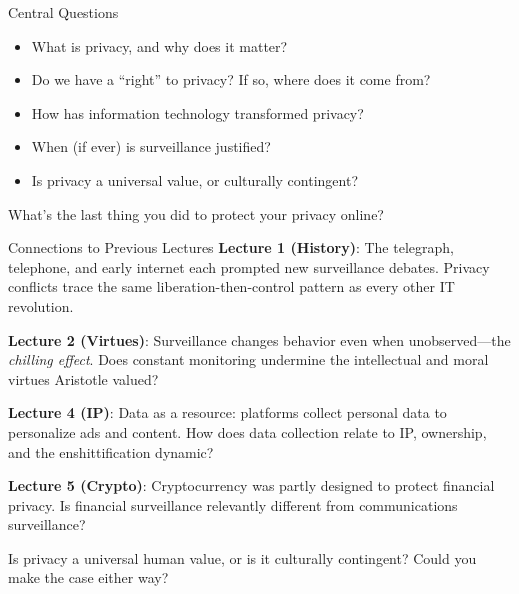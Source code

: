 ﻿\documentclass[aspectratio=169,11pt]{beamer}
\begin{document}
\begin{frame}{Central Questions}
\begin{itemize}
    \item What is privacy, and why does it matter?
    \item Do we have a ``right'' to privacy? If so, where does it come from?
    \item How has information technology transformed privacy?
    \item When (if ever) is surveillance justified?
    \item Is privacy a universal value, or culturally contingent?
\end{itemize}

\vspace{0.5em}
\begin{discussionbox}[Discussion]
What's the last thing you did to protect your privacy online?
\end{discussionbox}
\end{frame}

\begin{frame}{Connections to Previous Lectures}
\textbf{Lecture 1 (History)}: The telegraph, telephone, and early internet each prompted new surveillance debates. Privacy conflicts trace the same liberation-then-control pattern as every other IT revolution.

\vspace{0.2cm}
\textbf{Lecture 2 (Virtues)}: Surveillance changes behavior even when unobserved---the \textit{chilling effect}. Does constant monitoring undermine the intellectual and moral virtues Aristotle valued?

\vspace{0.2cm}
\textbf{Lecture 4 (IP)}: Data as a resource: platforms collect personal data to personalize ads and content. How does data collection relate to IP, ownership, and the enshittification dynamic?

\vspace{0.2cm}
\textbf{Lecture 5 (Crypto)}: Cryptocurrency was partly designed to protect financial privacy. Is financial surveillance relevantly different from communications surveillance?

\begin{discussionbox}[Discussion]
Is privacy a universal human value, or is it culturally contingent? Could you make the case either way?
\end{discussionbox}
\end{frame}
\end{document}
